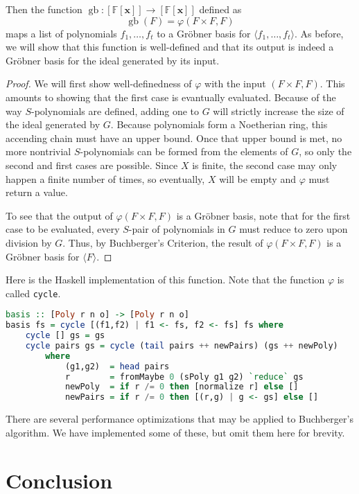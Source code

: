 \documentclass[MS, xcolor=dvipsnames]{wfuthesis}
\def\bF{\mathbb{F}}
\DeclareMathOperator{\gb}{gb}
\theoremstyle{definition}
\def\p{\varphi}
\begin{document}
Then the function $\gb: [\bF[\mathbf x]] \to [\bF[\mathbf x]]$ defined as
\[ \gb(F) = \p(F \times F,F) \]
maps a list of polynomials $f_1,\dots,f_t$ to a Gr\"obner basis for $\langle f_1,\dots,f_t \rangle$. As before, we will show that this function is well-defined and that its output is indeed a Gr\"obner basis for the ideal generated by its input. 
\begin{proof}
  We will first show well-definedness of $\p$ with the input $(F \times F,F)$. This amounts to showing that the first case is evantually evaluated. Because of the way $S$-polynomials are defined, adding one to $G$ will strictly increase the size of the ideal generated by $G$. Because polynomials form a Noetherian ring, this accending chain must have an upper bound. Once that upper bound is met, no more nontrivial $S$-polynomials can be formed from the elements of $G$, so only the second and first cases are possible. Since $X$ is finite, the second case may only happen a finite number of times, so eventually, $X$ will be empty and $\p$ must return a value. \par 
  To see that the output of $\p(F \times F,F)$ is a Gr\"obner basis, note that for the first case to be evaluated, every $S$-pair of polynomials in $G$ must reduce to zero upon division by $G$. Thus, by Buchberger's Criterion, the result of $\p(F \times F,F)$ is a Gr\"obner basis for $\langle F \rangle$. 
\end{proof}
Here is the Haskell implementation of this function. Note that the function $\p$ is called \lstinline{cycle}. 
\begin{lstlisting}[language=Haskell]
basis :: [Poly r n o] -> [Poly r n o]
basis fs = cycle [(f1,f2) | f1 <- fs, f2 <- fs] fs where
    cycle [] gs = gs
    cycle pairs gs = cycle (tail pairs ++ newPairs) (gs ++ newPoly)
        where
            (g1,g2)  = head pairs
            r        = fromMaybe 0 (sPoly g1 g2) `reduce` gs
            newPoly  = if r /= 0 then [normalize r] else []
            newPairs = if r /= 0 then [(r,g) | g <- gs] else []
\end{lstlisting}
There are several performance optimizations that may be applied to Buchberger's algorithm. We have implemented some of these, but omit them here for brevity. 

\chapter{Conclusion}





\end{document}
